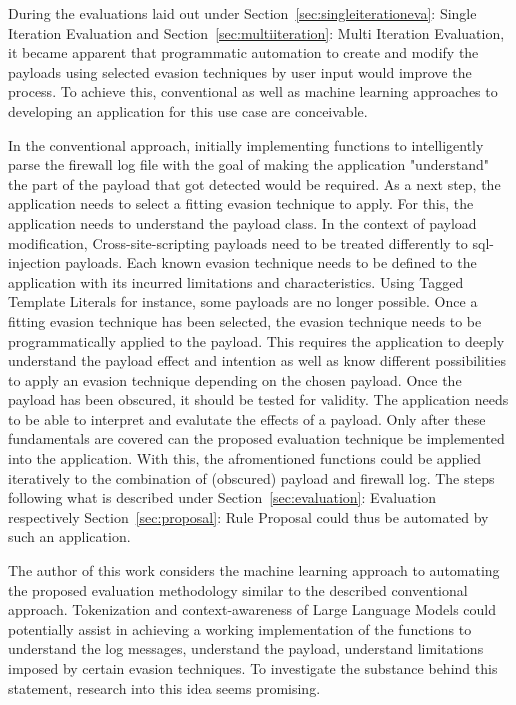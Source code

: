During the evaluations laid out under Section~\ref{sec:singleiterationeva}: Single Iteration Evaluation and Section~\ref{sec:multiiteration}: Multi Iteration Evaluation, it became apparent that programmatic automation to create and modify the payloads using selected evasion techniques by user input would improve the process. To achieve this, conventional as well as machine learning approaches to developing an application for this use case are conceivable.

In the conventional approach, initially implementing functions to intelligently parse the firewall log file with the goal of making the application "understand" the part of the payload that got detected would be required. As a next step, the application needs to select a fitting evasion technique to apply. For this, the application needs to understand the payload class. In the context of payload modification, Cross-site-scripting payloads need to be treated differently to sql-injection payloads. Each known evasion technique needs to be defined to the application with its incurred limitations and characteristics. Using Tagged Template Literals for instance, some payloads are no longer possible.
Once a fitting evasion technique has been selected, the evasion technique needs to be programmatically applied to the payload. This requires the application to deeply understand the payload effect and intention as well as know different possibilities to apply an evasion technique depending on the chosen payload. Once the payload has been obscured, it should be tested for validity. The application needs to be able to interpret and evalutate the effects of a payload. Only after these fundamentals are covered can the proposed evaluation technique be implemented into the application. With this, the afromentioned functions could be applied iteratively to the combination of (obscured) payload and firewall log. The steps following what is described under Section~\ref{sec:evaluation}: Evaluation respectively Section~\ref{sec:proposal}: Rule Proposal could thus be automated by such an application.

The author of this work considers the machine learning approach to automating the proposed evaluation methodology similar to the described conventional approach. Tokenization and context-awareness of Large Language Models could potentially assist in achieving a working implementation of the functions to understand the log messages, understand the payload, understand limitations imposed by certain evasion techniques. To investigate the substance behind this statement, research into this idea seems promising. 
